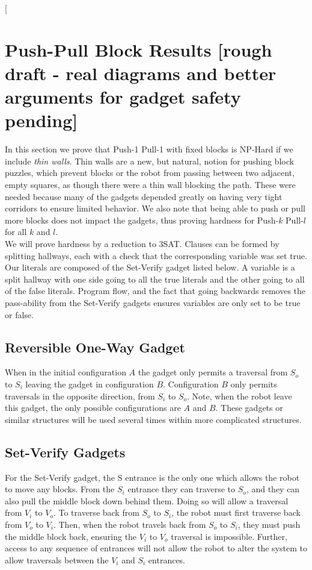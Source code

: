 \documentclass[11pt]{article}
\makeatletter
\gdef\xxx{\@ifnextchar[\xxx@lab\xxx@nolab}
\makeatother
\begin{document}
\xxx{might be more updating, check 6.890}


\section{Push-Pull Block Results  [rough draft - real diagrams and better arguments for gadget safety pending]}
In this section we prove that Push-1 Pull-1 with fixed blocks is NP-Hard if we include \emph{thin walls}. Thin walls are a new, but natural, notion for pushing block puzzles, which prevent blocks or the robot from passing between two adjacent, empty squares, as though there were a thin wall blocking the path. These were needed because many of the gadgets depended greatly on having very tight corridors to ensure limited behavior. We also note that being able to push or pull more blocks does not impact the gadgets, thus proving hardness for Push-$k$ Pull-$l$ for all $k$ and $l$. \\
We will prove hardness by a reduction to 3SAT. Clauses can be formed by splitting hallways, each with a check that the corresponding variable was set true. Our literals are composed of the Set-Verify gadget listed below. A variable is a split hallway with one side going to all the true literals and the other going to all of the false literals. Program flow, and the fact that going backwards removes the pass-ability from the Set-Verify gadgets ensures variables are only set to be true or false.

\subsection{Reversible One-Way Gadget}
When in the initial configuration $A$ the gadget only permits a traversal from $S_o$ to $S_i$ leaving the gadget in configuration $B$. Configuration $B$ only permits traversals in the opposite direction, from $S_i$ to $S_o$. Note, when the robot leave this gadget, the only possible configurations are $A$ and $B$. These gadgets or similar structures will be used several times within more complicated structures.
%

\subsection{Set-Verify Gadgets}
For the Set-Verify gadget, the S entrance is the only one which allows the robot to move any blocks. From the $S_i$ entrance they can traverse to $S_o$, and they can also pull the middle block down behind them. Doing so will allow a traversal from $V_i$ to $V_o$. To traverse back from $S_o$ to $S_i$, the robot must first traverse back from $V_o$ to $V_i$. Then, when the robot travels back from $S_o$ to $S_i$, they must push the middle block back, ensuring the $V_i$ to $V_o$ traversal is impossible. Further, access to any sequence of entrances will not allow the robot to alter the system to allow traversals between the $V_i$ and $S_i$ entrances. \\
\end{document}
